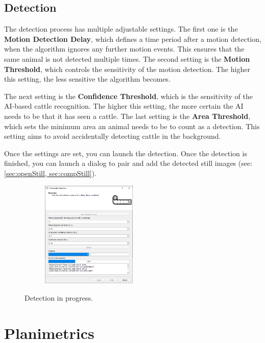 \documentclass[10pt,a4paper,oneside]{report}             %
\begin{document}
\subsection{Detection}

The detection process has multiple adjustable settings. The first one is the \textbf{Motion Detection Delay}, which defines a time period after a motion detection, when the algorithm ignores any further motion events. This ensures that the same animal is not detected multiple times. The second setting is the \textbf{Motion Threshold}, which controls the sensitivity of  the motion detection. The higher this setting, the less sensitive the algorithm becomes. 

The next setting is the \textbf{Confidence Threshold}, which is the sensitivity of the AI-based cattle recognition. The higher this setting, the more certain the AI needs to be that it has seen a cattle. The last setting is the \textbf{Area Threshold}, which sets the minimum area an animal needs to be to count as a detection. This setting aims to avoid accidentally detecting cattle in the background.

Once the settings are set, you can launch the detection. Once the detection is finished, you can launch a dialog to pair and add the detected still images (see: \autoref{sec:openStill, sec:compStill}).

\begin{figure}[H]
	\centering
	\begin{subfigure}{\textwidth}
		\centering 
		\includegraphics[width=0.5\textwidth]{./images/AutoDetect2.png}
	\end{subfigure}
	\caption[]
	{\small  Detection in progress.}
\end{figure} 

\section{Planimetrics}
\end{document}
